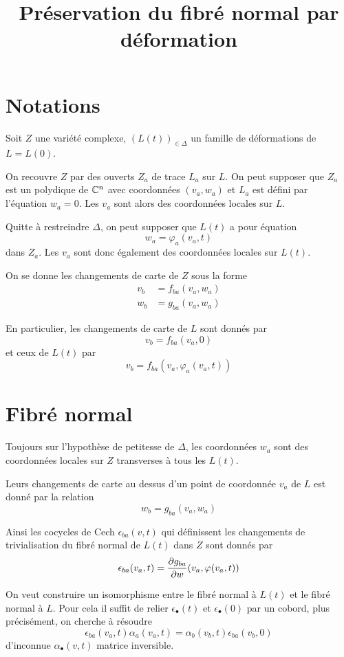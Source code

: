 \documentclass[a4paper]{article}
\date{}
\title{Préservation du fibré normal par déformation}
\begin{document}
\maketitle
\tableofcontents


\section{Notations}
\label{sec:orgheadline1}
Soit \(Z\) une variété complexe, \((L(t))_{\in \Delta}\) un famille de déformations de \(L = L(0)\).

On recouvre \(Z\) par des ouverts \(Z_a\) de trace \(L_a\) sur \(L\). On peut supposer que \(Z_a\) est un polydique de \(\mathbb{C}^n\) avec coordonnées \((v_a,w_a)\) et \(L_a\) est défini par l'équation \(w_a = 0\). Les \(v_a\) sont alors des coordonnées locales sur \(L\).

Quitte à restreindre \(\Delta\), on peut supposer que \(L(t)\) a pour équation
\[
w_a = \varphi_a(v_a,t)
\]
dans \(Z_a\). Les \(v_a\) sont donc également des coordonnées locales sur \(L(t)\).

On se donne les changements de carte de \(Z\) sous la forme
\begin{align}
v_b &= f_{ba}(v_a,w_a)\\
w_b &= g_{ba}(v_a,w_a)
\end{align}

En particulier, les changements de carte de \(L\) sont donnés par
\[
v_b = f_{ba}(v_a,0)
\]
et ceux de \(L(t)\) par
\[
v_b = f_{ba}(v_a,\varphi_a(v_a,t))
\]

\section{Fibré normal}
\label{sec:orgheadline2}
Toujours sur l'hypothèse de petitesse de \(\Delta\), les coordonnées \(w_a\) sont des coordonnées locales sur \(Z\) transverses à tous les \(L(t)\).

Leurs changements de carte au dessus d'un point de coordonnée \(v_a\) de \(L\) est donné par la relation
\[
w_b = g_{ba}(v_a,w_a)
\]

Ainsi les cocycles de Cech \(\epsilon_{ba}(v,t)\) qui définissent les changements de trivialisation du fibré normal de \(L(t)\) dans \(Z\) sont donnés par
\[
\epsilon_{ba}(v_a,t) = \dfrac{\partial{g_{ba}}}{\partial{w}}(v_a,\varphi(v_a,t))
\]

On veut construire un isomorphisme entre le fibré normal à \(L(t)\) et le fibré normal à \(L\). Pour cela il suffit de relier \(\epsilon_\bullet(t)\) et \(\epsilon_\bullet(0)\) par un cobord, plus précisément, on cherche à résoudre
\begin{equation}
\label{cobord}
\epsilon_{ba}(v_a,t)\alpha_a(v_a,t) = \alpha_b(v_b,t)\epsilon_{ba}(v_b,0)
\end{equation}
d'inconnue \(\alpha_\bullet(v,t)\) matrice inversible.
\end{document}
